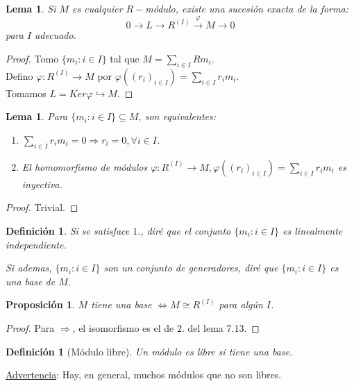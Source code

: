 \documentclass[11pt,a4paper]{article}
\theoremstyle{break}
\newtheorem{lemma}[theorem]{Lema}
\newtheorem{definition}[theorem]{Definición}
\newtheorem{proposition}[theorem]{Proposición}
\begin{document}
\begin{lemma}
Si $M$ es cualquier $R-$módulo, existe una sucesión exacta de la forma:
$$0 \to L \to R^{(I)} \overset{\varphi}{\to} M \to 0$$
para $I$ adecuado.
\end{lemma}

\begin{proof}
Tomo $\{m_{i}: i \in I\}$ tal que $M = \sum\limits_{i \in I} Rm_{i}$. \\
Defino $\varphi: R^{(I)} \to M$ por $\varphi((r_{i})_{i \in I}) = \sum\limits_{i \in I} r_{i}m_{i}$.\\
Tomamos $L = Ker \varphi \hookrightarrow M$.
\end{proof}

\begin{lemma}
Para $\{m_{i}: i \in I\} \subseteq M$, son equivalentes:
\begin{enumerate}
\item $\sum\limits_{i \in I} r_{i}m_{i} = 0 \Rightarrow r_{i} = 0, \forall i \in I$.
\item El homomorfismo de módulos $\varphi: R^{(I)} \to M, \varphi((r_{i})_{i \in I}) = \sum\limits_{i \in I} r_{i}m_{i}$ es inyectiva.
\end{enumerate}
\end{lemma}

\begin{proof}
Trivial.
\end{proof}

\begin{definition}
Si se satisface $1.$, diré que el conjunto $\{m_{i}: i \in I\}$ es linealmente independiente.

Si ademas, $\{m_{i}: i \in I\}$ son un conjunto de generadores, diré que $\{m_{i}: i \in I\}$ es una base de $M$.
\end{definition}

\begin{proposition}
$M$ tiene una base $\iff M \cong R^{(I)}$ para algún $I$.
\end{proposition}

\begin{proof}
Para $\Rightarrow$, el isomorfismo es el de $2.$ del lema 7.13.
\end{proof}

\begin{definition}[Módulo libre]
Un módulo es libre si tiene una base.
\end{definition}

\underline{Advertencia}: Hay, en general, muchos módulos que no son libres.
\end{document}
